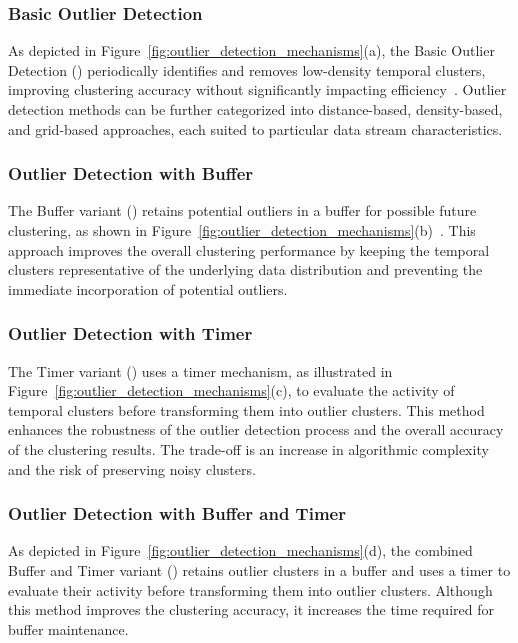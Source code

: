 \subsubsection{Basic Outlier Detection}
\label{subsec:detection}
As depicted in Figure~\ref{fig:outlier_detection_mechanisms}(a), the Basic Outlier Detection (\od) periodically identifies and removes low-density temporal clusters, improving clustering accuracy without significantly impacting efficiency~\cite{Clustream:03,DStream:2007}. Outlier detection methods can be further categorized into distance-based, density-based, and grid-based approaches, each suited to particular data stream characteristics.

\subsubsection{Outlier Detection with Buffer}
\label{subsec:buffer}
The Buffer variant (\buffer) retains potential outliers in a buffer for possible future clustering, as shown in Figure~\ref{fig:outlier_detection_mechanisms}(b)~\cite{DenStream:06,EDMStream:17}. This approach improves the overall clustering performance by keeping the temporal clusters representative of the underlying data distribution and preventing the immediate incorporation of potential outliers.

\subsubsection{Outlier Detection with Timer}
\label{subsec:timer}
The Timer variant (\timer) uses a timer mechanism, as illustrated in Figure~\ref{fig:outlier_detection_mechanisms}(c), to evaluate the activity of temporal clusters before transforming them into outlier clusters. This method enhances the robustness of the outlier detection process and the overall accuracy of the clustering results. The trade-off is an increase in algorithmic complexity and the risk of preserving noisy clusters.

\subsubsection{Outlier Detection with Buffer and Timer}
\label{subsec:buffertimer}
As depicted in Figure~\ref{fig:outlier_detection_mechanisms}(d), the combined Buffer and Timer variant (\buffertimer) retains outlier clusters in a buffer and uses a timer to evaluate their activity before transforming them into outlier clusters. Although this method improves the clustering accuracy, it increases the time required for buffer maintenance.

